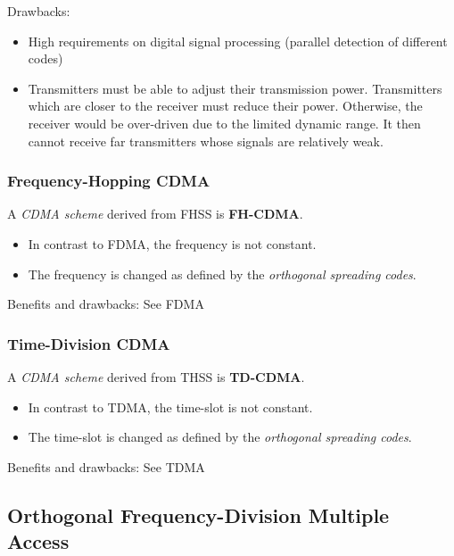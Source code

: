 \begin{refsection}
Drawbacks:
\begin{itemize}
	\item High requirements on digital signal processing (parallel detection of different codes)
	\item Transmitters must be able to adjust their transmission power. Transmitters which are closer to the receiver must reduce their power. Otherwise, the receiver would be over-driven due to the limited dynamic range. It then cannot receive far transmitters whose signals are relatively weak.
\end{itemize}

\subsubsection{Frequency-Hopping CDMA}

A \emph{\ac{CDMA} scheme} derived from \ac{FHSS} is  \textbf{\acf{FH-CDMA}}.
\begin{itemize}
	\item In contrast to \ac{FDMA}, the frequency is not constant.
	\item The frequency is changed as defined by the \emph{orthogonal spreading codes}.
\end{itemize}


Benefits and drawbacks: See \ac{FDMA}

\subsubsection{Time-Division CDMA}

A \emph{\ac{CDMA} scheme} derived from \ac{THSS} is  \textbf{\acf{TD-CDMA}}.
\begin{itemize}
	\item In contrast to \ac{TDMA}, the time-slot is not constant.
	\item The time-slot is changed as defined by the \emph{orthogonal spreading codes}.
\end{itemize}


Benefits and drawbacks: See \ac{TDMA}

\subsection{Orthogonal Frequency-Division Multiple Access}


\end{refsection}
